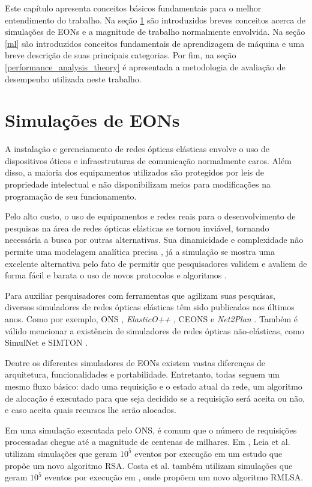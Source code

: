 Este capítulo apresenta conceitos básicos fundamentais para o melhor entendimento do trabalho. Na seção \ref{ft_eon} são introduzidos breves conceitos acerca de simulações de EONs e a magnitude de trabalho normalmente envolvida. Na seção \ref{ml} são introduzidos conceitos fundamentais de aprendizagem de máquina e uma breve descrição de suas principais categorias. Por fim, na seção \ref{performance_analysis_theory} é apresentada a metodologia de avaliação de desempenho utilizada neste trabalho.

\section{Simulações de EONs}%
\label{ft_eon}

A instalação e gerenciamento de redes ópticas elásticas envolve o uso de dispositivos óticos e infraestruturas de comunicação normalmente caros. Além disso, a maioria dos equipamentos utilizados são protegidos por leis de propriedade intelectual e não disponibilizam meios para modificações na programação de seu funcionamento.

Pelo alto custo, o uso de equipamentos e redes reais para o desenvolvimento de pesquisas na área de redes ópticas elásticas se tornou inviável, tornando necessária a busca por outras alternativas. Sua dinamicidade e complexidade não permite uma modelagem analítica precisa \cite{costa2016ons}, já a simulação se mostra uma excelente alternativa pelo fato de permitir que pesquisadores validem e avaliem de forma fácil e barata o uso de novos protocolos e algoritmos \cite{simulnet2009}.

Para auxiliar pesquisadores com ferramentas que agilizam suas pesquisas, diversos simuladores de redes ópticas elásticas têm sido publicados nos últimos anos. Como por exemplo, \acrfull{ONS} \cite{costa2016ons}, \textit{ElasticO++} \cite{TESSINARI201695}, \acrfull{CEONS} \cite{ceons2015} e \textit{Net2Plan} \cite{net2plan}. Também é válido mencionar a existência de simuladores de redes ópticas não-elásticas, como SimulNet \cite{simulnet2009} e SIMTON \cite{chaves2010}.

Dentre os diferentes simuladores de EONs existem vastas diferenças de arquitetura, funcionalidades e portabilidade. Entretanto, todas seguem um mesmo fluxo básico: dado uma requisição e o estado atual da rede, um algoritmo de alocação é executado para que seja decidido se a requisição será aceita ou não, e caso aceita quais recursos lhe serão alocados.

Em uma simulação executada pelo \acrfull{ONS}, é comum que o número de requisições processadas chegue até a magnitude de centenas de milhares. Em \cite{leia2019}, Leia et al. utilizam simulações que geram $10^5$ eventos por execução em um estudo que propõe um novo algoritmo RSA. Costa et al. também utilizam simulações que geram $10^5$ eventos por execução em \cite{rmlsaacosta2020}, onde propõem um novo algoritmo RMLSA.

